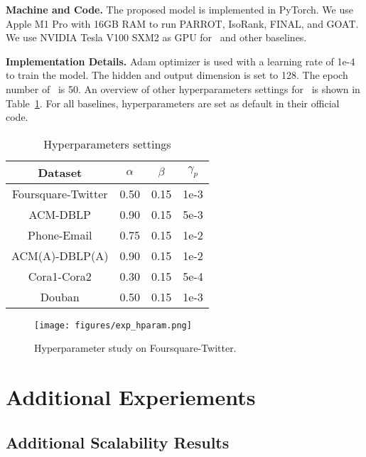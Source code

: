 \noindent\textbf{Machine and Code.} The proposed model is implemented in PyTorch. We use Apple M1 Pro with 16GB RAM to run PARROT, IsoRank, FINAL, and GOAT. We use NVIDIA Tesla V100 SXM2 as GPU for \algname\ and other baselines.

\noindent\textbf{Implementation Details.} Adam optimizer is used with a learning rate of 1e-4 to train the model. The hidden and output dimension is set to 128. The epoch number of \algname\ is 50. An overview of other hyperparameters settings for \algname\ is shown in Table~\ref{tab:hparam}. For all baselines, hyperparameters are set as default in their official code.

\vspace{-10pt}
\begin{table}[H]
\small
\centering
\caption{Hyperparameters settings}
\label{tab:hparam}
\vspace{-5pt}
\begin{tabular}{cccc}
\toprule
Dataset  & $\alpha$ & $\beta$ & $\gamma_p$ \\
\midrule
Foursquare-Twitter & 0.50 & 0.15 & 1e-3 \\
ACM-DBLP           & 0.90 & 0.15 & 5e-3 \\
Phone-Email        & 0.75 & 0.15 & 1e-2 \\
ACM(A)-DBLP(A)     & 0.90 & 0.15 & 1e-2 \\
Cora1-Cora2        & 0.30 & 0.15 & 5e-4 \\
Douban             & 0.50 & 0.15 & 1e-3 \\
\bottomrule
\end{tabular}
\vspace{-7pt}
\end{table}

\vspace{-10pt}
\begin{figure}[t]
  \texttt{[image: figures/exp\_hparam.png]}
  \vspace{-5pt}
  \caption{Hyperparameter study on Foursquare-Twitter.}
  \label{fig:exp_hparams}
  \vspace{-10pt}
\end{figure}

\vspace{-5pt}
\section{Additional Experiements}
\vspace{-2pt}
\subsection{Additional Scalability Results}

